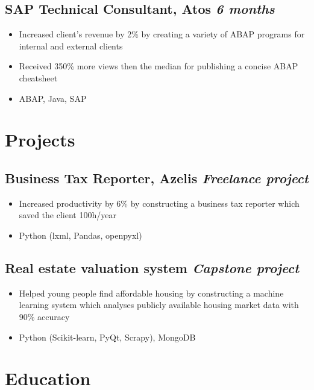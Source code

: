 \documentclass[a4paper]{article}
\newcommand{\bolditalicpair}
[2]
{\textbf{#1} \texorpdfstring{\hfill}{} \textit{#2}}
\begin{document}
\subsection{\bolditalicpair{SAP Technical Consultant, Atos}{6 months}}

\begin{itemize}
  \item Increased client's revenue by 2\% by creating a variety of ABAP programs for internal and external clients
  \item Received 350\% more views then the median for publishing a concise ABAP cheatsheet
  \item ABAP, Java, SAP
\end{itemize}



\section{Projects}
\subsection{\bolditalicpair{Business Tax Reporter, Azelis}{Freelance project}}

\begin{itemize}
  \item Increased productivity by 6\% by constructing a business tax reporter which saved the client 100h/year
  \item Python (lxml, Pandas, openpyxl)
\end{itemize}

\subsection{\bolditalicpair{Real estate valuation system}{Capstone project}}

\begin{itemize}
  \item Helped young people find affordable housing by constructing a machine learning system which analyses publicly available housing market data with 90\% accuracy
  \item Python (Scikit-learn, PyQt, Scrapy), MongoDB
\end{itemize}



\section{Education}
\end{document}
